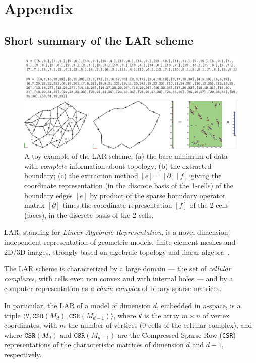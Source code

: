 

\appendix
\section{Appendix}
\subsection{Short summary of the LAR scheme}\label{sec:lar}

\begin{figure}[ptb] %
 \centering
 \includegraphics[width=\linewidth]{images/minimum} 
 \caption{A toy example of the LAR scheme: (a) the bare minimum of data with \emph{complete} information about topology; (b) the extracted boundary; (c) the extraction method $[e] = [\partial][f]$ giving the coordinate representation (in the discrete basis of the 1-cells) of the boundary edges $[e]$ by product of the sparse boundary operator matrix $[\partial]$ times the coordinate representation $[f]$ of the 2-cells (faces), in the discrete basis of the 2-cells.}
 \label{fig:minimum}
\end{figure}

LAR, standing for \emph{Linear Algebraic Representation}, is a novel dimension-independent representation of geometric models, finite element meshes and 2D/3D images, strongly based on algebraic topology and linear algebra~\cite{Dicarlo:2014:TNL:2543138.2543294,cadanda:2015}.

The LAR scheme is characterized by a large domain --- the set of \emph{cellular complexes}, with cells even non convex and with internal holes --- and by a computer representation as \emph{a chain complex} of binary sparse matrices. 

In particular, the LAR of a model of dimension $d$, embedded in $n$-space, is a triple $\langle \texttt{V}, \texttt{CSR}(M_d), \texttt{CSR}(M_{d-1}) \rangle$, where 
\texttt{V} is the array $m\times n$ of vertex coordinates, with $m$ the number of vertices (0-cells of the cellular complex), and where 
$\texttt{CSR}(M_d)$ and $\texttt{CSR}(M_{d-1})$ are the Compressed Sparse Row (\texttt{CSR}) representations of the characteristic matrices of dimension $d$ and $d-1$, respectively.  

